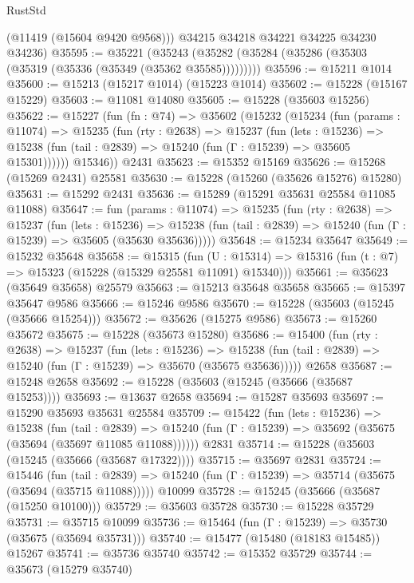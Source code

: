 \begin{lexlean}{RustStd}
\begin{coremodule}
        (@11419 (@15604 @9420 @9568)))
      @34215
      @34218
      @34221
      @34225
      @34230
      @34236)
@35595 := @35221
    (@35243 (@35282 (@35284 (@35286 (@35303 (@35319 (@35336 (@35349 (@35362 @35585)))))))))
@35596 := @15211 @1014
@35600 := @15213 (@15217 @1014) (@15223 @1014)
@35602 := @15228 (@15167 @15229)
@35603 := @11081 @14080
@35605 := @15228 (@35603 @15256)
@35622 := @15227
    (fun (fn : @74) =>
    @35602
      (@15232
        (@15234
          (fun (params : @11074) =>
          @15235
            (fun (rty : @2638) =>
            @15237
              (fun (lets : @15236) =>
              @15238 (fun (tail : @2839) => @15240 (fun (Γ : @15239) => @35605 @15301))))))
        @15346))
    @2431
@35623 := @15352 @15169
@35626 := @15268 (@15269 @2431) @25581
@35630 := @15228 (@15260 (@35626 @15276) @15280)
@35631 := @15292 @2431
@35636 := @15289 (@15291 @35631 @25584 @11085 @11088)
@35647 := fun (params : @11074) =>
  @15235
    (fun (rty : @2638) =>
    @15237
      (fun (lets : @15236) =>
      @15238 (fun (tail : @2839) => @15240 (fun (Γ : @15239) => @35605 (@35630 @35636)))))
@35648 := @15234 @35647
@35649 := @15232 @35648
@35658 := @15315
    (fun (U : @15314) => @15316 (fun (t : @7) => @15323 (@15228 (@15329 @25581 @11091) @15340)))
@35661 := @35623 (@35649 @35658) @25579
@35663 := @15213 @35648 @35658
@35665 := @15397 @35647 @9586
@35666 := @15246 @9586
@35670 := @15228 (@35603 (@15245 (@35666 @15254)))
@35672 := @35626 (@15275 @9586)
@35673 := @15260 @35672
@35675 := @15228 (@35673 @15280)
@35686 := @15400
    (fun (rty : @2638) =>
    @15237
      (fun (lets : @15236) =>
      @15238 (fun (tail : @2839) => @15240 (fun (Γ : @15239) => @35670 (@35675 @35636)))))
    @2658
@35687 := @15248 @2658
@35692 := @15228 (@35603 (@15245 (@35666 (@35687 @15253))))
@35693 := @13637 @2658
@35694 := @15287 @35693
@35697 := @15290 @35693 @35631 @25584
@35709 := @15422
    (fun (lets : @15236) =>
    @15238
      (fun (tail : @2839) =>
      @15240 (fun (Γ : @15239) => @35692 (@35675 (@35694 (@35697 @11085 @11088))))))
    @2831
@35714 := @15228 (@35603 (@15245 (@35666 (@35687 @17322))))
@35715 := @35697 @2831
@35724 := @15446
    (fun (tail : @2839) => @15240 (fun (Γ : @15239) => @35714 (@35675 (@35694 (@35715 @11088)))))
    @10099
@35728 := @15245 (@35666 (@35687 (@15250 @10100)))
@35729 := @35603 @35728
@35730 := @15228 @35729
@35731 := @35715 @10099
@35736 := @15464 (fun (Γ : @15239) => @35730 (@35675 (@35694 @35731)))
@35740 := @15477 (@15480 (@18183 @15485)) @15267
@35741 := @35736 @35740
@35742 := @15352 @35729
@35744 := @35673 (@15279 @35740)

\end{coremodule}
\end{lexlean}
